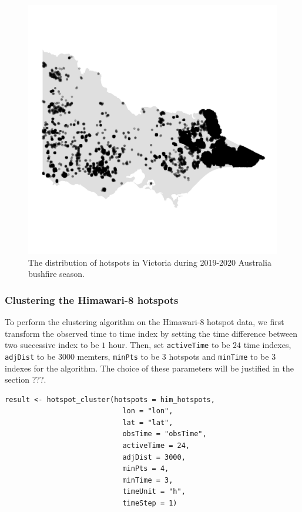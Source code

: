 \begin{Schunk}
\begin{figure}

{\centering \includegraphics[width=0.8\linewidth]{figures/before_clustering} 

}

\caption[The distribution of hotspots in Victoria during 2019-2020 Australia bushfire season]{The distribution of hotspots in Victoria during 2019-2020 Australia bushfire season.}\label{fig:hotspots}
\end{figure}
\end{Schunk}

\hypertarget{clustering-the-himawari-8-hotspots}{%
\subsubsection{Clustering the Himawari-8
hotspots}\label{clustering-the-himawari-8-hotspots}}

To perform the clustering algorithm on the Himawari-8 hotspot data, we
first transform the observed time to time index by setting the time
difference between two successive index to be \(1\) hour. Then, set
\texttt{activeTime} to be \(24\) time indexes, \texttt{adjDist} to be
\(3000\) memters, \texttt{minPts} to be \(3\) hotspots and
\texttt{minTime} to be \(3\) indexes for the algorithm. The choice of
these parameters will be justified in the section ???.

\begin{verbatim}
result <- hotspot_cluster(hotspots = him_hotspots,
                            lon = "lon",
                            lat = "lat",
                            obsTime = "obsTime",
                            activeTime = 24,
                            adjDist = 3000,
                            minPts = 4,
                            minTime = 3,
                            timeUnit = "h",
                            timeStep = 1)
\end{verbatim}

